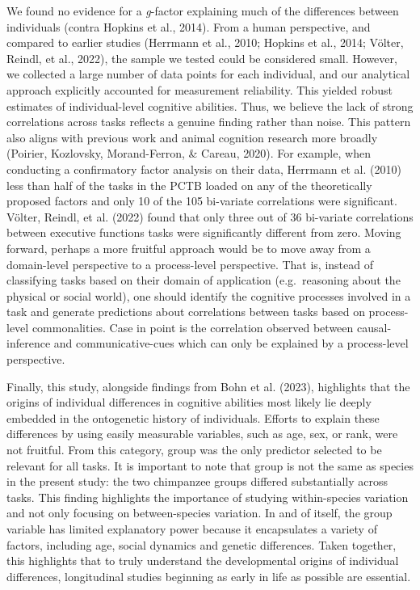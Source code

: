 \documentclass[
  man,floatsintext]{apa6}
\begin{document}
We found no evidence for a \emph{g}-factor explaining much of the differences between individuals (contra Hopkins et al., 2014). From a human perspective, and compared to earlier studies (Herrmann et al., 2010; Hopkins et al., 2014; Völter, Reindl, et al., 2022), the sample we tested could be considered small. However, we collected a large number of data points for each individual, and our analytical approach explicitly accounted for measurement reliability. This yielded robust estimates of individual-level cognitive abilities. Thus, we believe the lack of strong correlations across tasks reflects a genuine finding rather than noise. This pattern also aligns with previous work and animal cognition research more broadly (Poirier, Kozlovsky, Morand-Ferron, \& Careau, 2020). For example, when conducting a confirmatory factor analysis on their data, Herrmann et al. (2010) less than half of the tasks in the PCTB loaded on any of the theoretically proposed factors and only 10 of the 105 bi-variate correlations were significant. Völter, Reindl, et al. (2022) found that only three out of 36 bi-variate correlations between executive functions tasks were significantly different from zero. Moving forward, perhaps a more fruitful approach would be to move away from a domain-level perspective to a process-level perspective. That is, instead of classifying tasks based on their domain of application (e.g.~reasoning about the physical or social world), one should identify the cognitive processes involved in a task and generate predictions about correlations between tasks based on process-level commonalities. Case in point is the correlation observed between causal-inference and communicative-cues which can only be explained by a process-level perspective.

Finally, this study, alongside findings from Bohn et al. (2023), highlights that the origins of individual differences in cognitive abilities most likely lie deeply embedded in the ontogenetic history of individuals. Efforts to explain these differences by using easily measurable variables, such as age, sex, or rank, were not fruitful. From this category, group was the only predictor selected to be relevant for all tasks. It is important to note that group is not the same as species in the present study: the two chimpanzee groups differed substantially across tasks. This finding highlights the importance of studying within-species variation and not only focusing on between-species variation. In and of itself, the group variable has limited explanatory power because it encapsulates a variety of factors, including age, social dynamics and genetic differences. Taken together, this highlights that to truly understand the developmental origins of individual differences, longitudinal studies beginning as early in life as possible are essential.
\end{document}
